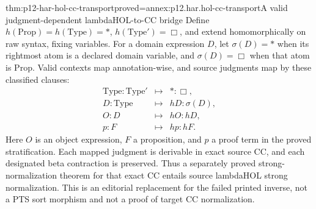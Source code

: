 \begin{hbtheorem}{thm:p12-har-hol-cc-transport}{proved=annex:p12.har.hol-cc-transport}{A valid judgment-dependent lambdaHOL-to-CC bridge}
Define \(h(\mathrm{Prop})=h(\mathrm{Type})=\ast\),
\(h(\mathrm{Type}')=\Box\), and extend homomorphically on
raw syntax, fixing variables. For a domain expression \(D\), let
\(\sigma(D)=\ast\) when its rightmost atom is a declared domain
variable, and \(\sigma(D)=\Box\) when that atom is
\(\mathrm{Prop}\). Valid contexts map annotation-wise, and
source judgments map by these classified clauses:
\[
\begin{array}{rcl}
 \mathrm{Type}:\mathrm{Type}'&\mapsto&\ast:\Box,\\
 D:\mathrm{Type}&\mapsto&hD:\sigma(D),\\
 O:D&\mapsto&hO:hD,\\
 p:F&\mapsto&hp:hF.
\end{array}
\]
Here \(O\) is an object expression, \(F\) a proposition, and
\(p\) a proof term in the proved stratification.
Each mapped judgment is derivable in exact source CC, and each designated
beta contraction is preserved. Thus a separately proved strong-normalization
theorem for that exact CC entails source lambdaHOL strong normalization.
This is an editorial replacement for the failed printed inverse, not a
PTS sort morphism and not a proof of target CC normalization.
\end{hbtheorem}

